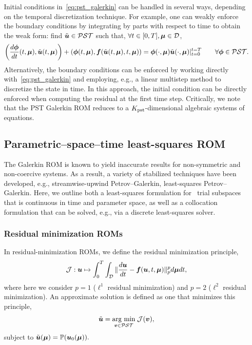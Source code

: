 \documentclass[3p,computermodern,10pt]{elsarticle}
\begin{document}
Initial conditions in~\eqref{eq:pst_galerkin} can be handled in several ways, depending on the temporal discretization technique. For example, one can weakly enforce the boundary conditions by integrating by parts with respect to time to obtain the weak form: find $\tilde{\boldsymbol u} \in \mathcal{PST}$ such that, $\forall t \in [0,T], \boldsymbol \mu \in \mathcal{D}$,
$$\left( \frac{d\boldsymbol \phi}{dt}(t,\boldsymbol \mu) ,\tilde{\boldsymbol u}(t,\boldsymbol \mu) \right) + \left(\boldsymbol \phi(t,\boldsymbol \mu),  \boldsymbol f(\tilde{\boldsymbol u}(t,\boldsymbol \mu),t,\boldsymbol \mu) \right)  = \boldsymbol \phi(\cdot,\boldsymbol \mu) \tilde{\boldsymbol u}(\cdot,\boldsymbol \mu) |_{t=0}^{t=T}\qquad \forall \boldsymbol \phi \in  \mathcal{PST}.$$
Alternatively, the boundary conditions can be enforced by working directly with~\eqref{eq:pst_galerkin} and employing, e.g., a linear multistep method to discretize the state in time. In this approach, the initial condition can be directly enforced when computing the residual at the first time step. Critically, we note that the PST Galerkin ROM reduces to a $K_{\text{pst}}$-dimensional algebraic systems of equations.  

\subsection{Parametric--space--time least-squares ROM}
The Galerkin ROM is known to yield inaccurate results for non-symmetric and non-coercive systems. As a result, a variety of stabilized techniques have been developed, e.g., streamwise-upwind Petrov--Galerkin, least-squares Petrov--Galerkin. Here, we outline both a least-squares formulation for \parametricSpaceTimeAcronym\ trial subspaces that is continuous in time and parameter space, as well as a collocation formulation that can be solved, e.g., via a discrete least-squares solver. 

\subsubsection{Residual minimization ROMs}
In residual-minimization ROMs, we define the residual minimization principle,
\begin{equation}\label{eq:minimization_principle}
\mathcal{J} : \boldsymbol u \mapsto \int_{0}^T \int_{\mathcal{D}} \| \frac{d \boldsymbol u}{dt} - \boldsymbol f(\boldsymbol u,t,\boldsymbol \mu) \|_{p}^p d\boldsymbol \mu dt,
\end{equation}
where here we consider $p=1$ ($\ell^1$ residual minimization) and $p=2$ ($\ell^2$ residual minimization).
An approximate solution is defined as one that minimizes this principle, 
\begin{equation}\label{eq:minimization_problem}
\tilde{\boldsymbol u} = \underset{ \boldsymbol v \in \mathcal{PST}}{\text{arg min}}\;\mathcal{J}(\boldsymbol v),
\end{equation}
subject to $\tilde{\boldsymbol u}(\boldsymbol \mu) = \mathbb{P}(\boldsymbol u_0(\boldsymbol \mu)).$ 
\end{document}

